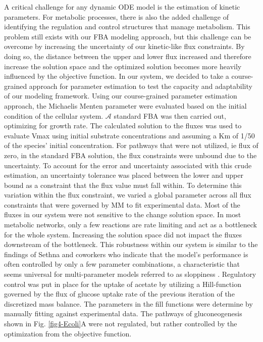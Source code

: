 \documentclass[12pt]{article}
\begin{document}
A critical challenge for any dynamic ODE model is the estimation of kinetic parameters. For metabolic processes, there is also the added challenge of identifying the regulation and control structures that manage metabolism. This problem still exists with our FBA modeling approach, but this challenge can be overcome by increasing the uncertainty of our kinetic-like flux constraints. By doing so, the distance between the upper and lower flux increased and therefore increase the solution space and the optimized solution becomes more heavily influenced by the objective function. In our system, we decided to take a course-grained approach for parameter estimation to test the capacity and adaptability of our modeling framework. Using our course-grained parameter estimation approach, the Michaelis Menten parameter were evaluated based on the initial condition of the cellular system. $\mathcal{A}$ standard FBA was then carried out, optimizing for growth rate. The calculated solution to the fluxes was used to evaluate Vmax using initial substrate concentrations and assuming a Km of 1/50 of the species’ initial concentration. For pathways that were not utilized, ie flux of zero, in the standard FBA solution, the flux constraints were unbound due to the uncertainty. To account for the error and uncertainty associated with this crude estimation, an uncertainty tolerance was placed between the lower and upper bound as a constraint that the flux value must fall within. To determine this variation within the flux constraint, we varied a global parameter across all flux constraints that were governed by MM to fit experimental data. Most of the fluxes in our system were not sensitive to the change solution space. In most metabolic networks, only a few reactions are rate limiting and act as a bottleneck for the whole system. Increasing the solution space did not impact the fluxes downstream of the bottleneck. This robustness within our system is similar to the findings of Sethna and coworkers who indicate that the model’s performance is often controlled by only a few parameter combinations, a characteristic that seems universal for multi-parameter models referred to as sloppiness \cite{machta2013parameter}. Regulatory control was put in place for the uptake of acetate by utilizing a Hill-function governed by the flux of glucose uptake rate of the previous iteration of the discretized mass balance. The parameters in the fill functions were determine by manually fitting against experimental data. The pathways of gluconeogenesis shown in Fig. \ref{fig4-Ecoli}A were not regulated, but rather controlled by the optimization from the objective function. 
\end{document}
